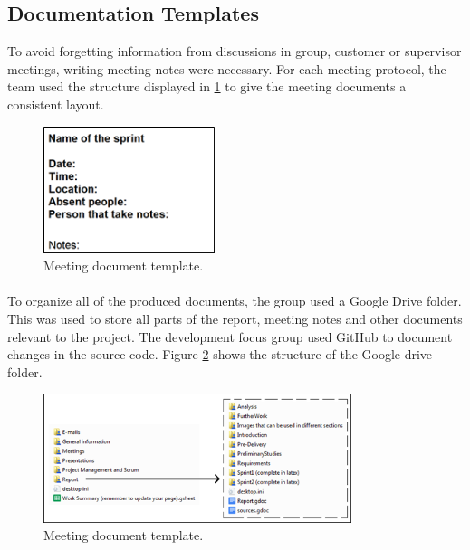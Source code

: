 \subsection{Documentation Templates}
\label{subsec:PlanningQualityDocu}
To avoid forgetting information from discussions in group, customer or supervisor meetings, writing meeting notes were necessary. For each meeting protocol, the team used the structure displayed in \ref{fig:PlanningQualityDocuMeeting} to give the meeting documents a consistent layout.

\begin{figure}[ht!]
\centering
\includegraphics[width=50mm]{./Planning/img/meetingdoctemplate}
\caption{Meeting document template. \label{fig:PlanningQualityDocuMeeting}}
\end{figure}

\paragraph{} To organize all of the produced documents, the group used a Google Drive folder. This was used to store all parts of the report, meeting notes and other documents relevant to the project. The development focus group used GitHub to document changes in the source code. Figure \ref{fig:PlanningQualityDocuDrive} shows the structure of the Google drive folder.

\begin{figure}[ht!]
\centering
\includegraphics[width=90mm]{./Planning/img/drivestructure}
\caption{Meeting document template. \label{fig:PlanningQualityDocuDrive}}
\end{figure}

